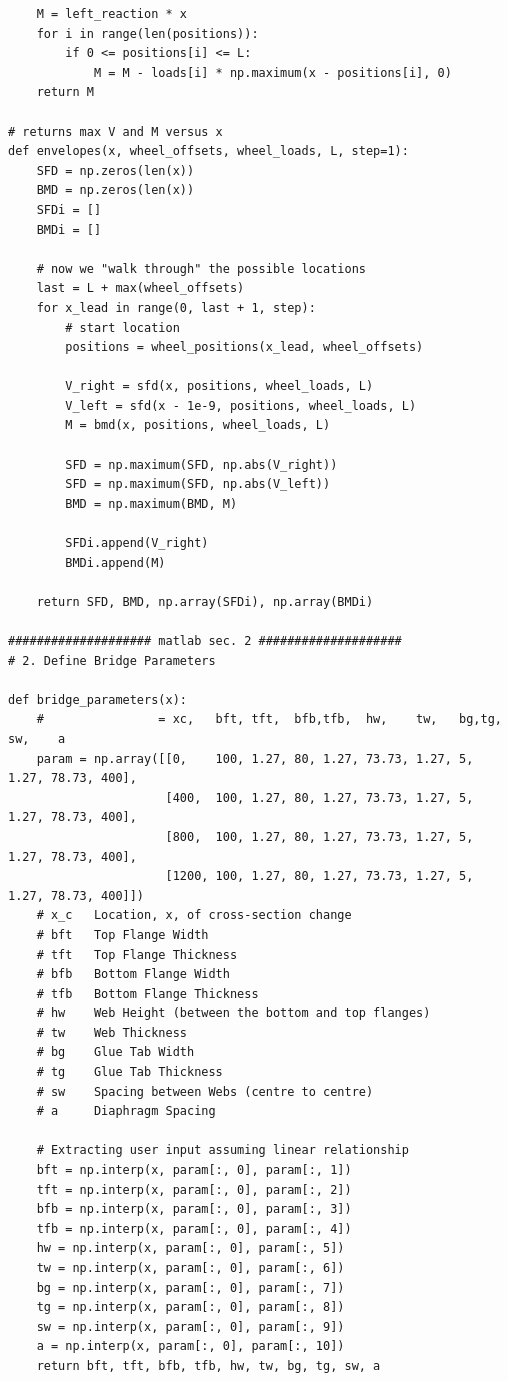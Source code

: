 \begin{verbatim}
    M = left_reaction * x
    for i in range(len(positions)):
        if 0 <= positions[i] <= L:
            M = M - loads[i] * np.maximum(x - positions[i], 0)
    return M

# returns max V and M versus x
def envelopes(x, wheel_offsets, wheel_loads, L, step=1):
    SFD = np.zeros(len(x))
    BMD = np.zeros(len(x))
    SFDi = []
    BMDi = []

    # now we "walk through" the possible locations
    last = L + max(wheel_offsets)
    for x_lead in range(0, last + 1, step):
        # start location
        positions = wheel_positions(x_lead, wheel_offsets)

        V_right = sfd(x, positions, wheel_loads, L)
        V_left = sfd(x - 1e-9, positions, wheel_loads, L)
        M = bmd(x, positions, wheel_loads, L)

        SFD = np.maximum(SFD, np.abs(V_right))
        SFD = np.maximum(SFD, np.abs(V_left))
        BMD = np.maximum(BMD, M)

        SFDi.append(V_right)
        BMDi.append(M)

    return SFD, BMD, np.array(SFDi), np.array(BMDi)

#################### matlab sec. 2 ####################
# 2. Define Bridge Parameters

def bridge_parameters(x):
    #                = xc,   bft, tft,  bfb,tfb,  hw,    tw,   bg,tg,   sw,    a
    param = np.array([[0,    100, 1.27, 80, 1.27, 73.73, 1.27, 5, 1.27, 78.73, 400],
                      [400,  100, 1.27, 80, 1.27, 73.73, 1.27, 5, 1.27, 78.73, 400],
                      [800,  100, 1.27, 80, 1.27, 73.73, 1.27, 5, 1.27, 78.73, 400],
                      [1200, 100, 1.27, 80, 1.27, 73.73, 1.27, 5, 1.27, 78.73, 400]])
    # x_c   Location, x, of cross-section change
    # bft   Top Flange Width
    # tft   Top Flange Thickness
    # bfb   Bottom Flange Width
    # tfb   Bottom Flange Thickness
    # hw    Web Height (between the bottom and top flanges)
    # tw    Web Thickness
    # bg    Glue Tab Width
    # tg    Glue Tab Thickness
    # sw    Spacing between Webs (centre to centre)
    # a     Diaphragm Spacing

    # Extracting user input assuming linear relationship
    bft = np.interp(x, param[:, 0], param[:, 1])
    tft = np.interp(x, param[:, 0], param[:, 2])
    bfb = np.interp(x, param[:, 0], param[:, 3])
    tfb = np.interp(x, param[:, 0], param[:, 4])
    hw = np.interp(x, param[:, 0], param[:, 5])
    tw = np.interp(x, param[:, 0], param[:, 6])
    bg = np.interp(x, param[:, 0], param[:, 7])
    tg = np.interp(x, param[:, 0], param[:, 8])
    sw = np.interp(x, param[:, 0], param[:, 9])
    a = np.interp(x, param[:, 0], param[:, 10])
    return bft, tft, bfb, tfb, hw, tw, bg, tg, sw, a


\end{verbatim}
